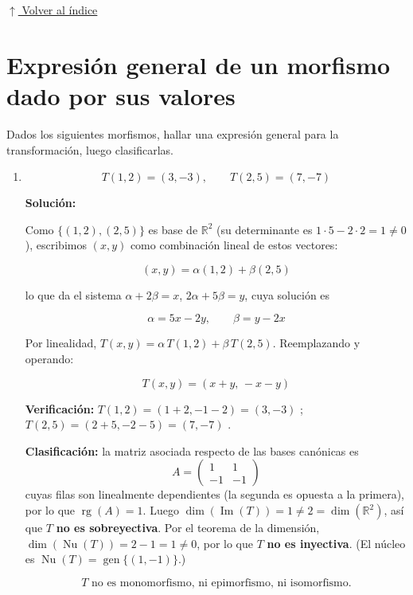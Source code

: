 \documentclass[12pt]{article}
\newcommand{\solucion}{%
    \vspace{0.8em}%
    \textbf{Solución:}%
    \vspace{0.8em}%
}
\newcommand{\volverindice}{%
    \vspace{1em}%
    \begin{flushright}%
        \hyperlink{indice}{\small $\uparrow$ Volver al índice}%
    \end{flushright}%
}
\begin{document}
\volverindice
\newpage


\section{Expresión general de un morfismo dado por sus valores}

Dados los siguientes morfismos, hallar una expresión general para la
transformación, luego clasificarlas.

\begin{enumerate}[label=\alph*.-]

    \item
    \[
    T(1,2)=(3,-3),\qquad T(2,5)=(7,-7)
    \]

    \solucion

    Como $\{(1,2),(2,5)\}$ es base de $\mathbb{R}^2$ (su determinante
    es $1\cdot5-2\cdot2=1\neq0$), escribimos $(x,y)$ como combinación
    lineal de estos vectores:

    \[
    (x,y)=\alpha(1,2)+\beta(2,5)
    \]

    lo que da el sistema $\alpha+2\beta=x$, $2\alpha+5\beta=y$, cuya
    solución es

    \[
    \alpha=5x-2y,\qquad \beta=y-2x
    \]

    Por linealidad, $T(x,y)=\alpha\,T(1,2)+\beta\,T(2,5)$. Reemplazando
    y operando:

    \[
    \boxed{T(x,y)=(x+y,\,-x-y)}
    \]

    \textbf{Verificación:} $T(1,2)=(1+2,-1-2)=(3,-3)$ \checkmark;
    $T(2,5)=(2+5,-2-5)=(7,-7)$ \checkmark.

    \textbf{Clasificación:} la matriz asociada respecto de las bases
    canónicas es
    \[
    A=\begin{pmatrix}1&1\\-1&-1\end{pmatrix}
    \]
    cuyas filas son linealmente dependientes (la segunda es opuesta a
    la primera), por lo que $\operatorname{rg}(A)=1$. Luego
    $\dim(\operatorname{Im}(T))=1\neq2=\dim(\mathbb{R}^2)$, así que
    $T$ \textbf{no es sobreyectiva}. Por el teorema de la dimensión,
    $\dim(\operatorname{Nu}(T))=2-1=1\neq0$, por lo que $T$
    \textbf{no es inyectiva}.
    (El núcleo es $\operatorname{Nu}(T)=\operatorname{gen}\{(1,-1)\}$.)

    \[
    \boxed{T \text{ no es monomorfismo, ni epimorfismo, ni isomorfismo.}}
    \]


\end{enumerate}
\end{document}
